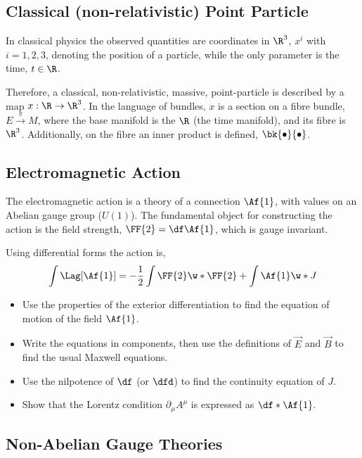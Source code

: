 \subsection{Classical (non-relativistic) Point Particle}

In classical physics the observed quantities are coordinates in $\R^3$, $x^i$ with $i=1,2,3$, denoting the position of a particle, while the only parameter is the time,  $t\in \R$.

Therefore, a classical, non-relativistic, massive, point-particle is described by a map $x:\R\to\R^3$. In the language of bundles, $x$ is a section on a fibre bundle, $E\xrightarrow{~\pi~}M$, where the base manifold is the $\R$ (the time manifold), and its fibre is $\R^3$. Additionally, on the fibre an inner product is defined, $\bk{\bullet}{\bullet}$.




\subsection{Electromagnetic Action}

The electromagnetic action is a theory of a connection $\Af{1}$, with values on an Abelian gauge group ($U(1)$). The fundamental object for constructing the action is the field strength, $\FF{2}=\df\Af{1}$, which is gauge invariant.

Using differential forms the action is,
\begin{align}
  \int\Lag[\Af{1}] = -\frac{1}{2}\int \FF{2}\w *\FF{2}+\int \Af{1}\w*J
\end{align}


\begin{Ebox}
  \begin{itemize}
  \item Use the properties of the exterior differentiation to find the equation of motion of the field $\Af{1}$.
  \item Write the equations in components, then use the definitions of $\vec{E}$ and $\vec{B}$ to find the usual Maxwell equations.
  \item Use the nilpotence of $\df$ (or $\dfd$) to find the continuity equation of $J$.
  \item Show that the Lorentz condition $\partial_\mu A^\mu$ is expressed as $\df*\Af{1}$.
  \end{itemize}
\end{Ebox}
     


\subsection{Non-Abelian Gauge Theories}

